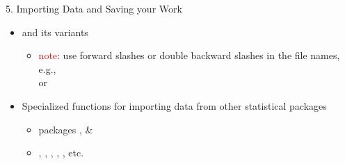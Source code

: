 \documentclass[14pt, aspectratio=169, sectionpage=simple, xclolor=table]{beamer}
\begin{document}
\begin{frame}[fragile, t]{5. Importing Data and Saving your Work}
\vspace*{-5mm}
\begin{itemize}
\item {} and its variants
\begin{itemize}
\item \textcolor{red}{note}: use forward slashes or double backward slashes in the file names, e.g.,\\
 or\\
\nl
\end{itemize}
\item Specialized functions for importing data from other statistical packages
\begin{itemize}
\item packages ,   \& 
\item {}, , , , , etc.
\nl
\end{itemize}
\end{itemize}

\end{frame}
\end{document}
